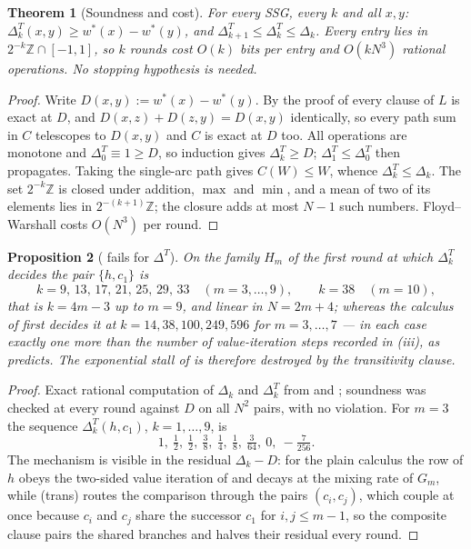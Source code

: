 \documentclass[11pt]{article}
\theoremstyle{plain}
\newtheorem{theorem}{Theorem}[section]
\newtheorem{proposition}[theorem]{Proposition}
\theoremstyle{definition}
\begin{document}
\begin{theorem}[Soundness and cost]\label{thm:trans-sound}
For every SSG, every $k$ and all $x,y$:
$\Delta^{T}_k(x,y)\ge w^\ast(x)-w^\ast(y)$, and
$\Delta^{T}_{k+1}\le\Delta^{T}_k\le\Delta_k$. Every entry lies in
$2^{-k}\mathbb{Z}\cap[-1,1]$, so $k$ rounds cost $O(k)$ bits per entry
and $O(kN^{3})$ rational operations. No stopping hypothesis is needed.
\end{theorem}

\begin{proof}
Write $D(x,y):=w^\ast(x)-w^\ast(y)$. By the proof of
 every clause of $L$ is exact at $D$, and
$D(x,z)+D(z,y)=D(x,y)$ identically, so every path sum in $C$ telescopes
to $D(x,y)$ and $C$ is exact at $D$ too. All operations are monotone and
$\Delta^{T}_0\equiv1\ge D$, so induction gives $\Delta^{T}_k\ge D$;
$\Delta^{T}_1\le\Delta^{T}_0$ then propagates. Taking the single-arc path
gives $C(W)\le W$, whence $\Delta^{T}_k\le\Delta_k$. The set
$2^{-k}\mathbb Z$ is closed under addition, $\max$ and $\min$, and a mean
of two of its elements lies in $2^{-(k+1)}\mathbb Z$; the closure adds at
most $N-1$ such numbers. Floyd--Warshall costs $O(N^{3})$ per round.
\end{proof}

\begin{proposition}[ fails for
$\Delta^{T}$]\label{prop:trans-Hm}
On the family $H_m$ of  the first round at which
$\Delta^{T}_k$ decides the pair $\{h,c_1\}$ is
\[
  k=9,\,13,\,17,\,21,\,25,\,29,\,33\quad(m=3,\dots,9),\qquad k=38\quad(m=10),
\]
that is $k=4m-3$ up to $m=9$, and linear in $N=2m+4$; whereas the
calculus of  first decides it at
$k=14,38,100,249,596$ for $m=3,\dots,7$ --- in each case exactly one more
than the number of value-iteration steps recorded in
(iii), as  predicts. The exponential stall of  is therefore
destroyed by the transitivity clause.
\end{proposition}

\begin{proof}
Exact rational computation of $\Delta_k$ and $\Delta^{T}_k$ from
 and ; soundness was checked at
every round against $D$ on all $N^{2}$ pairs, with no violation. For
$m=3$ the sequence $\Delta^{T}_k(h,c_1)$, $k=1,\dots,9$, is
\[
  1,\ \tfrac12,\ \tfrac12,\ \tfrac38,\ \tfrac14,\ \tfrac18,\ \tfrac3{64},\ 0,\ -\tfrac7{256}.
\]
The mechanism is visible in the residual $\Delta_k-D$: for the plain
calculus the row of $h$ obeys the two-sided value iteration of
 and decays at the mixing rate of $G_m$, while
(trans) routes the comparison through the pairs $(c_i,c_j)$, which couple
at once because $c_i$ and $c_j$ share the successor $c_1$ for
$i,j\le m-1$, so the composite clause pairs the shared branches and
halves their residual every round.
\end{proof}
\end{document}
